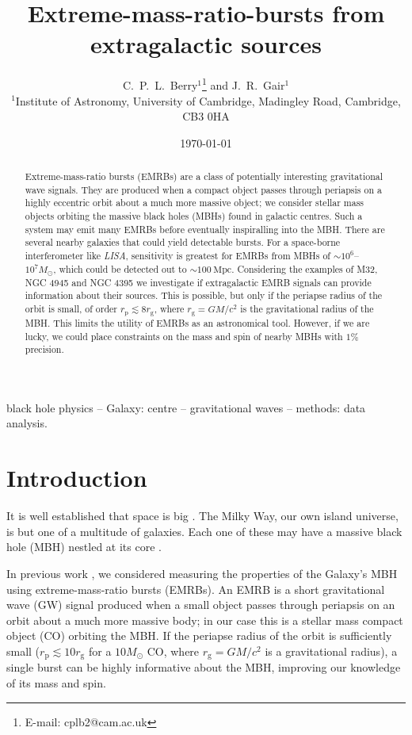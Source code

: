 \documentclass[useAMS,usedcolumn,usegraphicx,usenatbib]{mn2e}
\title[EMRBs from extragalactic sources]{Extreme-mass-ratio-bursts from extragalactic sources}
\author[C.\ P.\ L.\ Berry and J.\ R.\ Gair]{C.\ P.\ L.\ Berry$^{1}$\thanks{E-mail: cplb2@cam.ac.uk} and J.\ R.\ Gair$^{1}$\\
$^{1}$Institute of Astronomy, University of Cambridge, Madingley Road, Cambridge, CB3 0HA}
\newcommand{\units}[1]{\ensuremath{~\mathrm{#1}}}
\newcommand{\sub}[1]{\ensuremath{_\mathrm{#1}}}
\begin{document}
\date{\today}

\pagerange{\pageref{firstpage}--\pageref{lastpage}} 

\maketitle

\label{firstpage}

\begin{abstract}
Extreme-mass-ratio bursts (EMRBs) are a class of potentially interesting gravitational wave signals. They are produced when a compact object passes through periapsis on a highly eccentric orbit about a much more massive object; we consider stellar mass objects orbiting the massive black holes (MBHs) found in galactic centres. Such a system may emit many EMRBs before eventually inspiralling into the MBH. There are several nearby galaxies that could yield detectable bursts. For a space-borne interferometer like \textit{LISA}, sensitivity is greatest for EMRBs from MBHs of $\sim10^6$--$10^7 M_\odot$, which could be detected out to $\sim 100\units{Mpc}$. Considering the examples of M32, NGC 4945 and NGC 4395 we investigate if extragalactic EMRB signals can provide information about their sources. This is possible, but only if the periapse radius of the orbit is small, of order $r\sub{p} \lesssim 8 r\sub{g}$, where $r\sub{g} = GM/c^2$ is the gravitational radius of the MBH. This limits the utility of EMRBs as an astronomical tool. However, if we are lucky, we could place constraints on the mass and spin of nearby MBHs with $1\%$ precision.
\end{abstract}

\begin{keywords}
black hole physics -- Galaxy: centre -- gravitational waves -- methods: data analysis.
\end{keywords}

\section{Introduction}\label{sec:Intro}

It is well established that space is big \citep[chapter 8]{Adams1979}. The Milky Way, our own island universe, is but one of a multitude of galaxies. Each one of these may have a massive black hole (MBH) nestled at its core \citep{Lynden-Bell1971, Soltan1982}.

In previous work \citep{Berry2013}, we considered measuring the properties of the Galaxy's MBH using extreme-mass-ratio bursts (EMRBs). An EMRB is a short gravitational wave (GW) signal produced when a small object passes through periapsis on an orbit about a much more massive body; in our case this is a stellar mass compact object (CO) orbiting the MBH. If the periapse radius of the orbit is sufficiently small ($r\sub{p} \lesssim 10 r\sub{g}$ for a $10 M_\odot$ CO, where $r\sub{g} = GM/c^2$ is a gravitational radius), a single burst can be highly informative about the MBH, improving our knowledge of its mass and spin.
\end{document}
